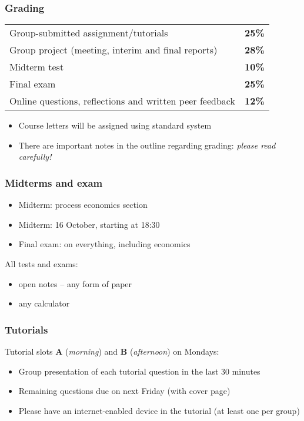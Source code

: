 \begin{frame}\frametitle{Grading}
	\begin{tabular}{lc}
		Group-submitted assignment/tutorials 					& \textbf{25\%} \\
		Group project (meeting, interim and final reports)		& \textbf{28\%} \\
		Midterm test											& \textbf{10\%} \\
		Final exam												& \textbf{25\%} \\
		Online questions, reflections and written peer feedback	& \textbf{12\%}
	\end{tabular}

	\vspace{24pt}
	\begin{itemize}
		\item	Course letters will be assigned using standard system
		\item	There are important notes in the outline regarding grading: \emph{please read carefully!}
	\end{itemize}

\end{frame}

\begin{frame}\frametitle{Midterms and exam}

	\begin{itemize}
		\item	Midterm: process economics section
		\item	Midterm: 16 October, starting at 18:30
		\item	Final exam: on everything, including economics
	\end{itemize}

	\vspace{24pt}
	All tests and exams:
	\begin{itemize}
		\item	open notes -- any form of paper
		\item	any calculator
	\end{itemize}
\end{frame}

\begin{frame}\frametitle{Tutorials}
	Tutorial slots \textbf{A} (\emph{morning}) and \textbf{B} (\emph{afternoon}) on Mondays:

	\begin{itemize}
		\item	Group presentation of each tutorial question in the last 30 minutes
		\item	Remaining questions due on next Friday {\scriptsize (with cover page)}
		\item	Please have an internet-enabled device in the tutorial (at least one per group)
	\end{itemize}
\end{frame}

